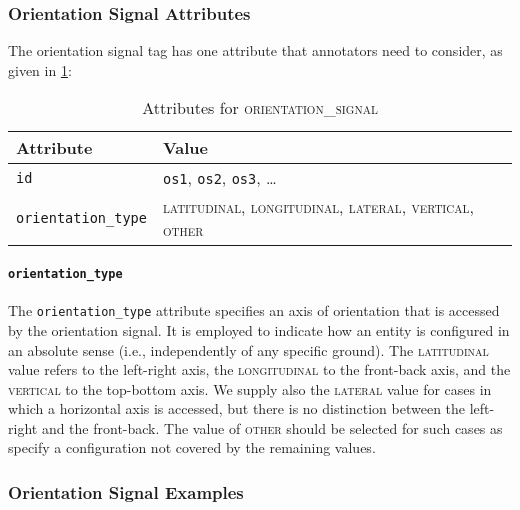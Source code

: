 \documentclass[11pt]{article}
\newenvironment{attributes}
{
\begin{tabular}{|l|l|}
    \hline \textbf{Attribute} & \textbf{Value}\\
}
{   \hline
\end{tabular}
}
\begin{document}

\subsubsection{Orientation Signal Attributes} %
\label{ssub:orientation_signal_attributes}

The orientation signal tag has one attribute that annotators need to consider, as given in \cref{tab:orientation_signal}:

\begin{table}[h]
\centering
\begin{attributes}
    \hline \texttt{id}                  & \texttt{os1}, \texttt{os2}, 
                                          \texttt{os3}, \ldots\\
    \hline \texttt{orientation\_type}   & \textsc{latitudinal}, \textsc{longitudinal}, \textsc{lateral}, \textsc{vertical}, \textsc{other}\\
\end{attributes}
\caption{Attributes for \textsc{orientation\_signal}}
\label{tab:orientation_signal}
\end{table}

\paragraph{\texttt{orientation\_type}} %
\label{par:orientation_type}
The \texttt{orientation\_type} attribute specifies an axis of orientation that is accessed by the orientation signal. It is employed to indicate how an entity is configured in an absolute sense (i.e., independently of any specific ground). The \textsc{latitudinal} value refers to the left-right axis, the \textsc{longitudinal} to the front-back axis, and the \textsc{vertical} to the top-bottom axis. We supply also the \textsc{lateral} value for cases in which a horizontal axis is accessed, but there is no distinction between the left-right and the front-back. The value of \textsc{other} should be selected for such cases as specify a configuration not covered by the remaining values.



\subsubsection{Orientation Signal Examples} %
\label{ssub:orientation_signal_examples}
\end{document}
